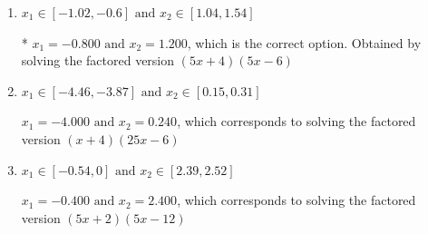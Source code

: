 \documentclass{extbook}[14pt]
\begin{document}
\begin{enumerate}
{\begin{enumerate}[label=\Alph*.]
$x_1 = -1.600 \text{ and } x_2 = 0.600$, which corresponds to solving the factored version $(5x + 8)(5x -3)$
\item \( x_1 \in [-1.02, -0.6] \text{ and } x_2 \in [1.04, 1.54] \)

* $x_1 = -0.800 \text{ and } x_2 = 1.200$, which is the correct option. Obtained by solving the factored version $(5x + 4)(5x -6)$
\item \( x_1 \in [-4.46, -3.87] \text{ and } x_2 \in [0.15, 0.31] \)

$x_1 = -4.000 \text{ and } x_2 = 0.240$, which corresponds to solving the factored version $(x + 4)(25x -6)$
\item \( x_1 \in [-0.54, 0] \text{ and } x_2 \in [2.39, 2.52] \)

$x_1 = -0.400 \text{ and } x_2 = 2.400$, which corresponds to solving the factored version $(5x + 2)(5x -12)$
\end{enumerate}

}
\end{enumerate}
\end{document}
